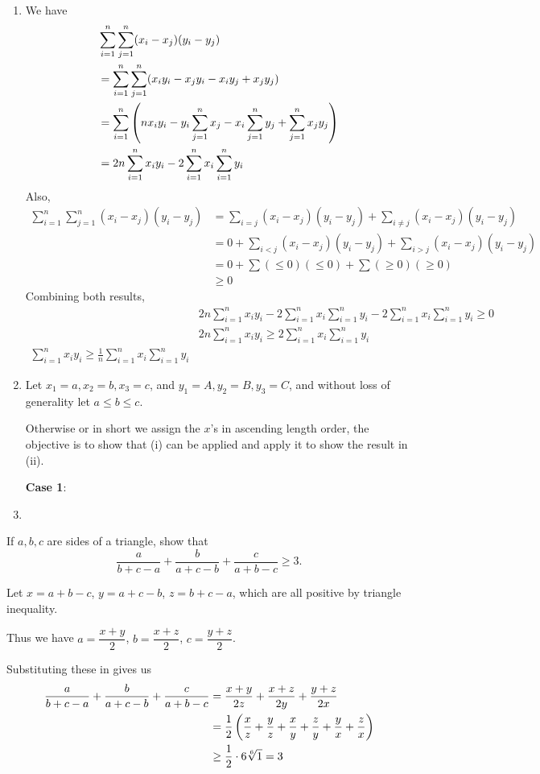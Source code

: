 \begin{solution} \
\begin{enumerate}[label=(\roman*)]
\item We have
\begin{align*}
&\sum_{i=1}^n\sum_{j=1}^n(x_i-x_j)(y_i-y_j) \\
&= \sum_{i=1}^n\sum_{j=1}^n(x_iy_i-x_jy_i-x_iy_j+x_jy_j) \\
&= \sum_{i=1}^n\left(nx_iy_i-y_i\sum_{j=1}^nx_j-x_i\sum_{j=1}^ny_j+\sum_{j=1}^nx_jy_j\right) \\
&= 2n\sum_{i=1}^nx_iy_i-2\sum_{i=1}^nx_i\sum_{i=1}^ny_i
\end{align*}
Also,
\begin{align*}
\sum_{i=1}^n\sum_{j=1}^n(x_i-x_j)(y_i-y_j)
&=\sum_{i=j}(x_i-x_j)(y_i-y_j)+\sum_{i\neq j}(x_i-x_j)(y_i-y_j) \\
&= 0+\sum_{i<j}(x_i-x_j)(y_i-y_j)+\sum_{i>j}(x_i-x_j)(y_i-y_j) \\
&= 0+\sum(\le0)(\le0)+\sum(\ge0)(\ge0) \\
&\ge0
\end{align*}
Combining both results,
\begin{align*}
&2n\sum_{i=1}^nx_iy_i-2\sum_{i=1}^nx_i\sum_{i=1}^ny_i-2\sum_{i=1}^nx_i\sum_{i=1}^ny_i\ge0 \\
&2n\sum_{i=1}^nx_iy_i\ge2\sum_{i=1}^nx_i\sum_{i=1}^ny_i \\
\sum_{i=1}^nx_iy_i\ge\frac{1}{n}\sum_{i=1}^nx_i\sum_{i=1}^ny_i
\end{align*}

\item Let $x_1=a,x_2=b,x_3=c$, and $y_1=A,y_2=B,y_3=C$, and without loss of generality let $a\le b\le c$.

Otherwise or in short we assign the $x$'s in ascending length order, the objective is to show that (i) can be applied and apply it to show the result in (ii).

\textbf{Case 1}: 

\item 
\end{enumerate}
\end{solution}
\pagebreak

\begin{prbm}
If $a,b,c$ are sides of a triangle, show that
\[ \frac{a}{b+c-a}+\frac{b}{a+c-b}+\frac{c}{a+b-c}\ge3. \]
\end{prbm}

\begin{solution}
Let $x=a+b-c$, $y=a+c-b$, $z=b+c-a$, which are all positive by triangle inequality.

Thus we have $a=\dfrac{x+y}{2}$, $b=\dfrac{x+z}{2}$, $c=\dfrac{y+z}{2}$.

Substituting these in gives us
\begin{align*}
\frac{a}{b+c-a}+\frac{b}{a+c-b}+\frac{c}{a+b-c}
&= \frac{x+y}{2z}+\frac{x+z}{2y}+\frac{y+z}{2x} \\
&= \frac{1}{2}\left(\frac{x}{z}+\frac{y}{z}+\frac{x}{y}+\frac{z}{y}+\frac{y}{x}+\frac{z}{x}\right) \\
&\ge \frac{1}{2}\cdot6\sqrt[6]{1}=3
\end{align*}
\end{solution}
\pagebreak

